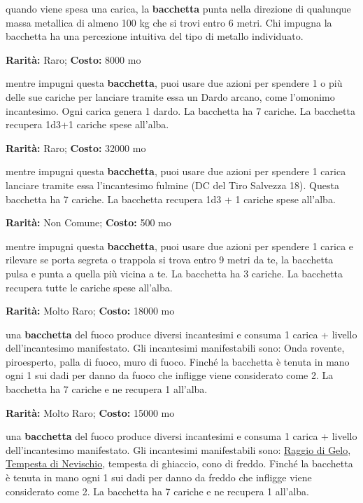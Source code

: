 \begin{multicols}{2}
quando viene spesa una carica, la \textbf{bacchetta} punta nella direzione di qualunque massa metallica di almeno 100 kg che si trovi entro 6 metri. Chi impugna la bacchetta ha una percezione intuitiva del tipo di metallo individuato.


\textbf{Rarità:} Raro; \textbf{Costo:} 8000 mo

mentre impugni questa \textbf{bacchetta}, puoi usare due azioni per spendere 1 o più delle sue cariche per lanciare tramite essa un Dardo arcano, come l'omonimo incantesimo. Ogni carica genera 1 dardo. La bacchetta ha 7 cariche. La bacchetta recupera 1d3+1 cariche spese all'alba.


\textbf{Rarità:} Raro; \textbf{Costo:} 32000 mo

mentre impugni questa \textbf{bacchetta}, puoi usare due azioni per spendere 1 carica lanciare tramite essa l'incantesimo fulmine (DC del Tiro Salvezza 18).
Questa bacchetta ha 7 cariche. La bacchetta recupera 1d3 + 1 cariche spese all'alba.


\textbf{Rarità:} Non Comune; \textbf{Costo:} 500 mo

mentre impugni questa \textbf{bacchetta}, puoi usare due azioni per spendere 1 carica e rilevare se porta segreta o trappola si trova entro 9 metri da te, la bacchetta pulsa e punta a quella più vicina a te. La bacchetta ha 3 cariche. La bacchetta recupera tutte le cariche spese all'alba.


\textbf{Rarità:} Molto Raro; \textbf{Costo:} 18000 mo

una \textbf{bacchetta} del fuoco produce diversi incantesimi e consuma 1 carica + livello dell'incantesimo manifestato. Gli incantesimi manifestabili sono: Onda rovente, piroesperto, palla di fuoco, muro di fuoco. Finché la bacchetta è tenuta in mano ogni 1 sui dadi per danno da fuoco che infligge viene considerato come 2. La bacchetta ha 7 cariche e ne recupera 1 all'alba.


\textbf{Rarità:} Molto Raro; \textbf{Costo:} 15000 mo

una \textbf{bacchetta} del fuoco produce diversi incantesimi e consuma 1 carica + livello dell'incantesimo manifestato. Gli incantesimi manifestabili sono: \hyperlink{Raggio di Gelo}{Raggio di Gelo}, \hyperlink{Tempesta di Nevischio}{Tempesta di Nevischio}, tempesta di ghiaccio, cono di freddo. Finché la bacchetta è tenuta in mano ogni 1 sui dadi per danno da freddo che infligge viene considerato come 2. La bacchetta ha 7 cariche e ne recupera 1 all'alba.


\end{multicols}
